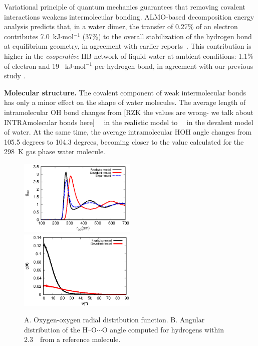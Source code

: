 \documentclass[aps,prl,reprint,amsmath,amssymb]{revtex4-1}
\begin{document}
Variational principle of quantum mechanics guarantees that removing covalent interactions weakens intermolecular bonding. 
ALMO-based decomposition energy analysis predicts that, in a water dimer, the transfer of 0.27\% of an electron contributes  7.0~kJ$\cdot$mol$^{-1}$ (37\%) to the overall stabilization of the hydrogen bond at equilibrium geometry, in agreement with earlier reports~\cite{stevens1987frozen,chen1996energy,piquemal2005csov,RZK-khaliullin2009dimer}. 
This contribution is higher in the \emph{cooperative} HB network of liquid water at ambient conditions: 1.1\% of electron and 19 ~kJ$\cdot$mol$^{-1}$ per hydrogen bond, in agreement with our previous study \cite{kuhne2014nature}.

\textbf{Molecular structure.} The covalent component of weak intermolecular bonds has only a minor effect on the shape of water molecules. 
The average length of intramolecular OH bond changes from [RZK the values are wrong- we talk about INTRAmolecular bonds here] \old~\Ang\ in the realistic model to \old~\Ang\ in the devalent model of water. 
At the same time, the average intramolecular HOH angle changes from 105.5 degrees to 104.3 degrees, becoming closer to the value calculated for the 298~K gas phase water molecule.

\begin{figure}
\includegraphics[width=0.5\textwidth]{new_rdf}
\includegraphics[width=0.5\textwidth]{new_adf}
\caption{A. Oxygen-oxygen radial distribution function. B. Angular distribution of the H--O$\cdots$O angle computed for hydrogens within 2.3~\Ang\ from a reference molecule.} \label{Fig:RDF}
\end{figure}
\end{document}
